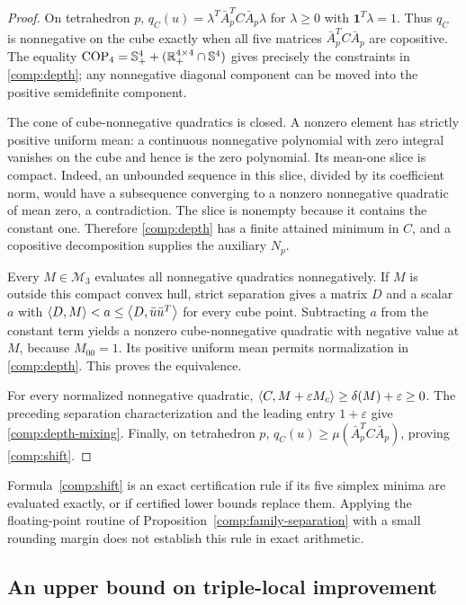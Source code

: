 \begin{proof}
On tetrahedron $p$, $q_C(u)=\lambda^T\bar A_p^TC\bar A_p\lambda$
for $\lambda\geq0$ with $\mathbf1^T\lambda=1$. Thus $q_C$ is
nonnegative on the cube exactly when all five matrices
$\bar A_p^TC\bar A_p$ are copositive. The equality
$\operatorname{COP}_4=\mathbb S^4_++(\mathbb R_+^{4\times4}\cap\mathbb S^{4})$ gives precisely the constraints
in \eqref{comp:depth}; any nonnegative diagonal component can be moved
into the positive semidefinite component.

The cone of cube-nonnegative quadratics is closed. A nonzero element has
strictly positive uniform mean: a continuous nonnegative polynomial with
zero integral vanishes on the cube and hence is the zero polynomial.
Its mean-one slice is compact. Indeed, an unbounded sequence in this
slice, divided by its coefficient norm, would have a subsequence converging
to a nonzero nonnegative quadratic of mean zero, a contradiction.
The slice is nonempty because it contains the constant one. Therefore
\eqref{comp:depth} has a finite attained minimum in $C$, and a
copositive decomposition supplies the auxiliary $N_p$.

Every $M\in\mathcal M_3$ evaluates all nonnegative
quadratics nonnegatively. If $M$ is outside this compact convex hull,
strict separation gives a matrix $D$ and a scalar $a$ with
$\left\langle D,M\right\rangle<a\leq\left\langle D,\bar u\bar u^T\right\rangle$ for every cube
point. Subtracting $a$ from the constant term yields a nonzero
cube-nonnegative quadratic with negative value at $M$, because
$M_{00}=1$. Its positive uniform mean permits normalization in
\eqref{comp:depth}. This proves the equivalence.

For every normalized nonnegative quadratic,
$\left\langle C,M+\varepsilon M_c\right\rangle\geq\delta(M)+\varepsilon\geq0$.
The preceding separation characterization and the leading entry
$1+\varepsilon$ give \eqref{comp:depth-mixing}. Finally, on tetrahedron
$p$, $q_C(u)\geq\mu(\bar A_p^TC\bar A_p)$, proving
\eqref{comp:shift}.
\end{proof}

Formula~\eqref{comp:shift} is an exact certification rule if its five
simplex minima are evaluated exactly, or if certified lower bounds replace
them. Applying the floating-point routine of
Proposition~\ref{comp:family-separation} with a small rounding margin
does not establish this rule in exact arithmetic.

\subsection{An upper bound on triple-local improvement}

